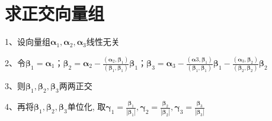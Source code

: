 \section{求正交向量组}

1、设向量组$\boldsymbol{\alpha}_{1}, \boldsymbol{\alpha}_{2}, \boldsymbol{\alpha}_{3}$线性无关

2、令$\boldsymbol{\beta}_{1}=\boldsymbol{\alpha}_{1}$；$\boldsymbol{\beta}_{2}=\boldsymbol{\alpha}_{2}-\frac{\left(\boldsymbol{\alpha}_{2}, \boldsymbol{\beta}_{1}\right)}{\left(\boldsymbol{\beta}_{1}, \boldsymbol{\beta}_{1}\right)} \boldsymbol{\beta}_{1}$；$\boldsymbol{\beta}_{3}=\boldsymbol{\alpha}_{3}-\frac{\left(\boldsymbol{\alpha}{3}, \boldsymbol{\beta}_{1}\right)}{\left(\boldsymbol{\beta}_{1}, \boldsymbol{\beta}_{1}\right)} \boldsymbol{\beta}_{1}-\frac{\left(\boldsymbol{\alpha}_{3}, \boldsymbol{\beta}_{2}\right)}{\left(\boldsymbol{\beta}_{2}, \boldsymbol{\beta}_{2}\right)} \boldsymbol{\beta}_{2}$

3、则$\boldsymbol{\beta}_{1}, \boldsymbol{\beta}_{2}, \boldsymbol{\beta}_{3}$两两正交

4、再将$\boldsymbol{\beta}_{1}, \boldsymbol{\beta}_{2}, \boldsymbol{\beta}_{3}$单位化, 取$\boldsymbol{\gamma}_{1}=\frac{\boldsymbol{\beta}_{1}}{\left|\boldsymbol{\beta}_{1}\right|}, \boldsymbol{\gamma}_{2}=\frac{\boldsymbol{\beta}_{2}}{\left|\boldsymbol{\beta}_{2}\right|}, \boldsymbol{\gamma}_{3}=\frac{\boldsymbol{\beta}_{3}}{\left|\boldsymbol{\beta}_{3}\right|}$

